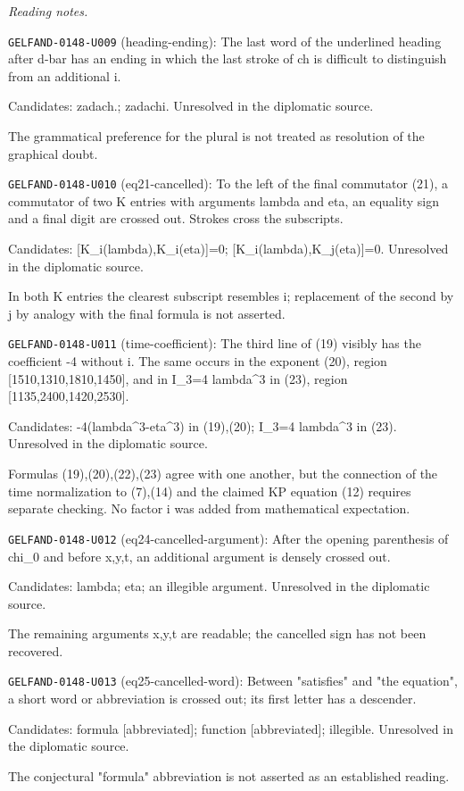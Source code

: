 \par\smallskip\noindent\textit{Reading notes.}\par
\noindent\texttt{GELFAND-0148-U009} (heading-ending): The last word of the underlined heading after d-bar has an ending in which the last stroke of ch is difficult to distinguish from an additional i.\par
Candidates: zadach.; zadachi. Unresolved in the diplomatic source.\par
The grammatical preference for the plural is not treated as resolution of the graphical doubt.\par
\noindent\texttt{GELFAND-0148-U010} (eq21-cancelled): To the left of the final commutator (21), a commutator of two K entries with arguments lambda and eta, an equality sign and a final digit are crossed out. Strokes cross the subscripts.\par
Candidates: [K\_i(lambda),K\_i(eta)]=0; [K\_i(lambda),K\_j(eta)]=0. Unresolved in the diplomatic source.\par
In both K entries the clearest subscript resembles i; replacement of the second by j by analogy with the final formula is not asserted.\par
\noindent\texttt{GELFAND-0148-U011} (time-coefficient): The third line of (19) visibly has the coefficient -4 without i. The same occurs in the exponent (20), region [1510,1310,1810,1450], and in I\_3=4 lambda\textasciicircum{}3 in (23), region [1135,2400,1420,2530].\par
Candidates: -4(lambda\textasciicircum{}3-eta\textasciicircum{}3) in (19),(20); I\_3=4 lambda\textasciicircum{}3 in (23). Unresolved in the diplomatic source.\par
Formulas (19),(20),(22),(23) agree with one another, but the connection of the time normalization to (7),(14) and the claimed KP equation (12) requires separate checking. No factor i was added from mathematical expectation.\par
\noindent\texttt{GELFAND-0148-U012} (eq24-cancelled-argument): After the opening parenthesis of chi\_0 and before x,y,t, an additional argument is densely crossed out.\par
Candidates: lambda; eta; an illegible argument. Unresolved in the diplomatic source.\par
The remaining arguments x,y,t are readable; the cancelled sign has not been recovered.\par
\noindent\texttt{GELFAND-0148-U013} (eq25-cancelled-word): Between "satisfies" and "the equation", a short word or abbreviation is crossed out; its first letter has a descender.\par
Candidates: formula [abbreviated]; function [abbreviated]; illegible. Unresolved in the diplomatic source.\par
The conjectural "formula" abbreviation is not asserted as an established reading.\par


